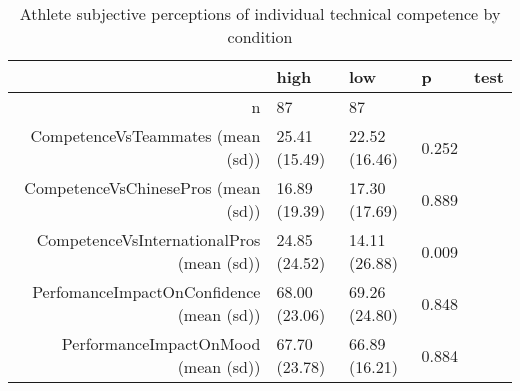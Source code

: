 \begin{table}[ht]
\centering
\begin{tabular}{rllll}
  \hline
 & high & low & p & test \\ 
  \hline
n &    87 &    87 &  &  \\ 
  CompetenceVsTeammates (mean (sd)) & 25.41 (15.49) & 22.52 (16.46) &  0.252 &  \\ 
  CompetenceVsChinesePros (mean (sd)) & 16.89 (19.39) & 17.30 (17.69) &  0.889 &  \\ 
  CompetenceVsInternationalPros (mean (sd)) & 24.85 (24.52) & 14.11 (26.88) &  0.009 &  \\ 
  PerfomanceImpactOnConfidence (mean (sd)) & 68.00 (23.06) & 69.26 (24.80) &  0.848 &  \\ 
  PerformanceImpactOnMood (mean (sd)) & 67.70 (23.78) & 66.89 (16.21) &  0.884 &  \\ 
   \hline
\end{tabular}
\caption{Athlete subjective perceptions of 
 individual technical competence by condition} 
\label{tab:indPerfTimeHighTraining}
\end{table}
